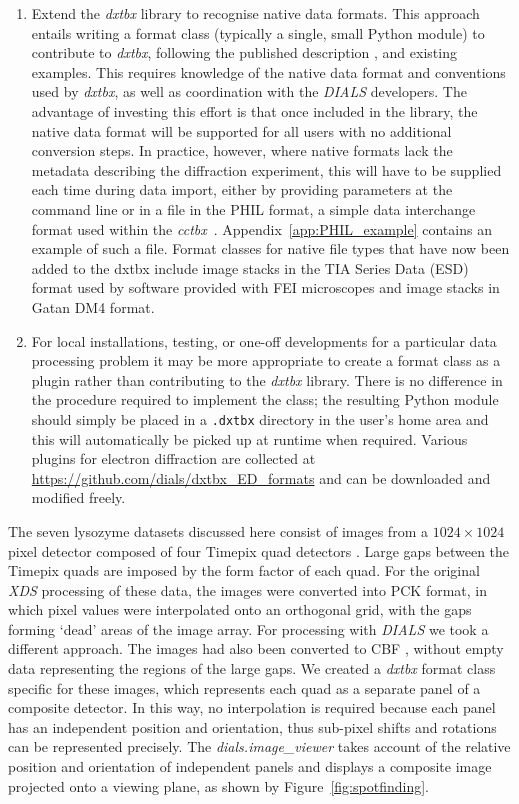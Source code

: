 \documentclass[preprint]{iucr}
\newcommand{\cctbx}{\emph{cctbx}\xspace}
\newcommand{\dxtbx}{\emph{dxtbx}\xspace}
\newcommand{\dials}{\emph{DIALS}\xspace}
\newcommand{\dialsimageviewer}{\emph{dials.image\_viewer}\xspace}
\newcommand{\code}{\texttt}
\newcommand{\xds}{\emph{XDS}\xspace}
\newcounter{DWCounter}
\newcommand{\DW}[1]{%
   \stepcounter{DWCounter}%
   {\color{red}{\textbf{DW \#\arabic{DWCounter}: }#1}}%
  }
\begin{document}
\begin{enumerate}
  \item Extend the \dxtbx library to recognise native data formats. This
  approach entails writing a format class (typically a single, small Python
  module) to contribute to \dxtbx, following the published description
  \cite{Parkhurst2014}, and existing examples. This requires knowledge of the
  native data format and conventions used by \dxtbx, as well as coordination
  with the \dials developers. The advantage of investing this effort is that
  once included in the library, the native data format will be supported for
  all users with no additional conversion steps. In practice, however, where
  native formats lack the metadata describing the diffraction experiment, this
  will have to be supplied each time during data import, either by providing
  parameters at the command line or in a file in the PHIL format, a simple data
  interchange format used within the \cctbx~\cite{Grosse-Kunstleve2002}.
  Appendix~\ref{app:PHIL_example} contains an example of such a file. Format
  classes for native file types that have now been added to the dxtbx include
  image stacks in the TIA Series Data (ESD) format used by software provided
  with FEI microscopes and image stacks in Gatan DM4 format.

  \item For local installations, testing, or one-off developments for a
  particular data processing problem it may be more appropriate to create a
  format class as a plugin rather than contributing to the \dxtbx library.
  There is no difference in the procedure required to implement the class; the
  resulting Python module should simply be placed in a \code{.dxtbx} directory
  in the user's home area and this will automatically be picked up at runtime
  when required. Various plugins for electron diffraction are collected at
  \url{https://github.com/dials/dxtbx_ED_formats} and can be downloaded and
  modified freely.

\end{enumerate}

The seven lysozyme datasets discussed here consist of images from a
$1024\times1024$ pixel detector composed of four Timepix quad detectors
\cite{Clabbers2017}. Large gaps between the Timepix quads are imposed by the
form factor of each quad. For the original \xds processing of these data, the
images were converted into PCK format, in which pixel values were interpolated
onto an orthogonal grid, with the gaps forming `dead' areas of the image array.
For processing with \dials we took a different approach. The images had also
been converted to CBF \DW{some details here - from Tim?}, without empty data
representing the regions of the large gaps. We created a \dxtbx format class
specific for these images, which represents each quad as a separate panel of a
composite detector. In this way, no interpolation is required because each
panel has an independent position and orientation, thus sub-pixel shifts and
rotations can be represented precisely. The \dialsimageviewer takes account
of the relative position and orientation of independent panels and displays a
composite image projected onto a viewing plane, as shown by
Figure~\ref{fig:spotfinding}.
\end{document}
